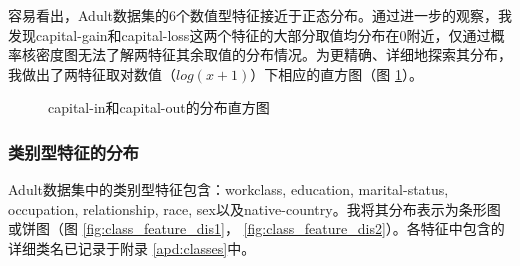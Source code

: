 \documentclass[12pt,a4paper]{article}
\theoremstyle{definition}
\begin{document}
\vspace{0.01\linewidth}
容易看出，Adult数据集的6个数值型特征接近于正态分布。通过进一步的观察，我发现capital-gain和capital-loss这两个特征的大部分取值均分布在0附近，仅通过概率核密度图无法了解两特征其余取值的分布情况。为更精确、详细地探索其分布，我做出了两特征取对数值（$log (x + 1)$）下相应的直方图（图 \ref{fig:cap-in-out}）。

\begin{figure}[H]
	\centering
	\caption{capital-in和capital-out的分布直方图}
	\label{fig:cap-in-out}
\end{figure}

\subsubsection{类别型特征的分布}

Adult数据集中的类别型特征包含：workclass, education, marital-status, occupation, relationship, race, sex以及native-country。我将其分布表示为条形图或饼图（图 \ref{fig:class_feature_dis1}， \ref{fig:class_feature_dis2}）。各特征中包含的详细类名已记录于附录 \ref{apd:classes}中。
\end{document}
